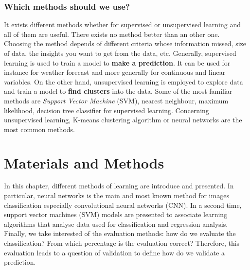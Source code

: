 \documentclass[11pt, openany]{report}
\theoremstyle{plain}
\theoremstyle{definition}
\theoremstyle{remark}
\begin{document}
\subsection{Which methods should we use?}
It exists different methods whether for supervised or unsupervised learning and all of them are useful. There exists no method better than an other one. Choosing the method depends of different criteria whose information missed, size of data, the insights you want to get from the data, etc. Generally, supervised learning is used to train a model to \textbf{make a prediction}. It can be used for instance for weather forecast and more generally for continuous and linear variables. On the other hand, unsupervised learning is employed to explore data and train a model to \textbf{find clusters} into the data. Some of the most familiar methods are \textit{Support Vector Machine} (SVM), nearest neighbour, maximum likelihood, decision tree classifier for supervised learning. Concerning unsupervised learning, K-means clustering algorithm or neural networks are the most common methods. 




\chapter{Materials and Methods} %


In this chapter, different methods of learning are introduce and presented. In particular, neural networks is the main and most known method for images classification especially convolutional neural networks (CNN). In a second time, support vector machines (SVM) models are presented to associate learning algorithms that analyse data used for classification and regression analysis. Finally, we take interested of the evaluation methods: how do we evaluate the classification? From which percentage is the evaluation correct? Therefore, this evaluation leads to a question of validation to define how do we validate a prediction.
\end{document}
